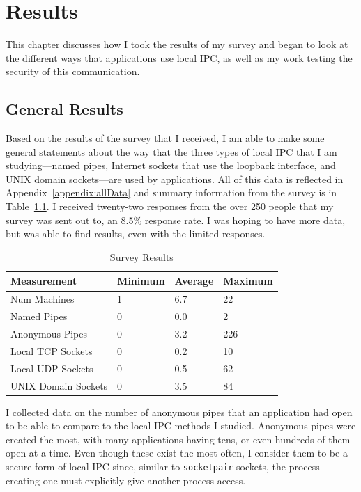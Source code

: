 \chapter{Results}
\label{sec:results}
This chapter discusses how I took the results of my survey and began to look at the different ways that applications use local IPC, as well as my work testing the security of this communication.

\section{General Results}
\label{sec:generalResults}
Based on the results of the survey that I received, I am able to make some general statements about the way that the three types of local IPC that I am studying---named pipes, Internet sockets that use the loopback interface, and UNIX domain sockets---are used by applications.  All of this data is reflected in Appendix~\ref{appendix:allData} and summary information from the survey is in Table~\ref{tab:surveyResults}.  I received twenty-two responses from the over 250 people that my survey was sent out to, an 8.5\% response rate.  I was hoping to have more data, but was able to find results, even with the limited responses.

\begin{table}
\centering
\begin{small}
\begin{tabular}{ l | l | l | l }
\textbf{Measurement} & \textbf{Minimum} & \textbf{Average} & \textbf{Maximum} \\ \hline
Num Machines & 1 & 6.7 & 22 \\ \hline
Named Pipes & 0 & 0.0 & 2 \\ \hline
Anonymous Pipes & 0 & 3.2 & 226 \\ \hline
Local TCP Sockets & 0 & 0.2 & 10 \\ \hline
Local UDP Sockets & 0 & 0.5 & 62 \\ \hline
UNIX Domain Sockets & 0 & 3.5 & 84 \\ \hline
\end{tabular}
\caption{Survey Results}
\label{tab:surveyResults}
\end{small}
\end{table} 

I collected data on the number of anonymous pipes that an application had open to be able to compare to the local IPC methods I studied.  Anonymous pipes were created the most, with many applications having tens, or even hundreds of them open at a time.  Even though these exist the most often, I consider them to be a secure form of local IPC since, similar to \texttt{socketpair} sockets, the process creating one must explicitly give another process access.

